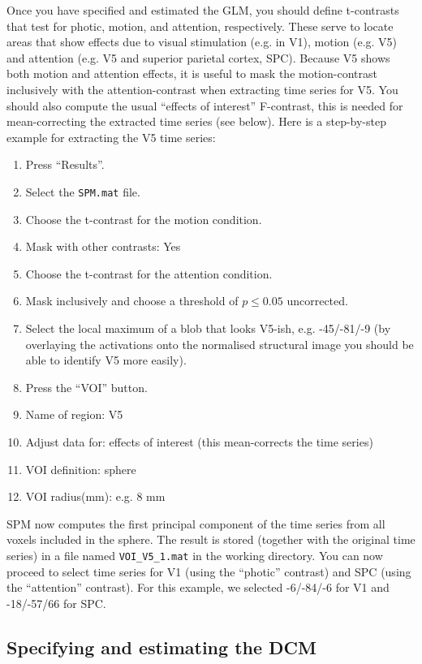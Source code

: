 Once you have specified and estimated the GLM, you should define t-contrasts that test for photic, motion, and attention, respectively. These serve to locate areas that show effects due to visual stimulation (e.g. in V1), motion (e.g. V5) and attention (e.g. V5 and superior parietal cortex, SPC). Because V5 shows both motion and attention effects, it is useful to mask the motion-contrast inclusively with the attention-contrast when extracting time series for V5. You should also compute the usual ``effects of interest'' F-contrast, this is needed for mean-correcting the extracted time series (see below). Here is a step-by-step example for extracting the V5 time series:
\begin{enumerate}
\item{Press ``Results''.}
\item{Select the \texttt{SPM.mat} file.}
\item{Choose the t-contrast for the motion condition.}
\item{Mask with other contrasts: Yes}
\item{Choose the t-contrast for the attention condition.}
\item{Mask inclusively and choose a threshold of $p \leq 0.05$ uncorrected.}
\item{Select the local maximum of a blob that looks V5-ish, e.g. -45/-81/-9 (by overlaying the activations onto the normalised structural image you should be able to identify V5 more easily).}
\item{Press the ``VOI'' button.}
\item{Name of region: V5}
\item{Adjust data for: effects of interest (this mean-corrects the time series)}
\item{VOI definition: sphere}
\item{VOI radius(mm): e.g. 8 mm}
\end{enumerate}
SPM now computes the first principal component of the time series from all voxels included in the sphere.  The result is stored (together with the original time series) in a file named \verb!VOI_V5_1.mat! in the working directory.  You can now proceed to select time series for V1 (using the ``photic'' contrast) and SPC (using the ``attention'' contrast).  For this example, we selected -6/-84/-6 for V1 and -18/-57/66 for SPC.

\subsection{Specifying and estimating the DCM}

